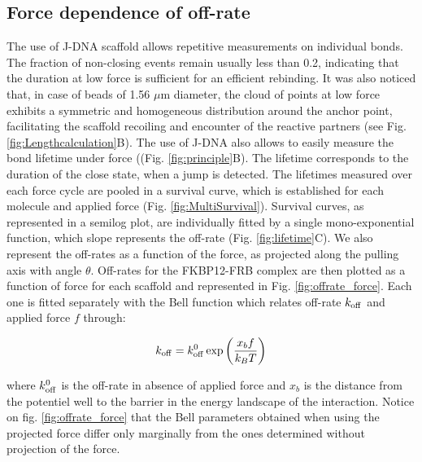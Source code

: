 \documentclass{biophys-new}
\begin{document}
\subsection*{Force dependence of off-rate}

The use of J-DNA scaffold allows repetitive measurements on individual bonds.
The fraction of non-closing events remain usually less than 0.2,  %
indicating that the duration at low force is sufficient for an efficient rebinding. It was also noticed that, in case of beads of 1.56 $\mu$m diameter, the cloud of points at low force exhibits a symmetric and homogeneous distribution around the anchor point, facilitating the scaffold recoiling and encounter of the reactive partners (see Fig. \ref{fig:Lengthcalculation}B). The use of J-DNA also allows to easily measure the bond lifetime under force ((Fig. \ref{fig:principle}B). The lifetime corresponds to the duration of the close state, when a jump is detected. %
The lifetimes measured over each force cycle are pooled in a survival curve, which is established for each molecule and applied force (Fig. \ref{fig:MultiSurvival}). Survival curves, as represented in a semilog plot, are individually fitted by a single mono-exponential function, which slope represents the off-rate (Fig. \ref{fig:lifetime}C). We also represent the off-rates as a function of the force, as projected along the pulling axis with angle $\theta$. Off-rates for the FKBP12-FRB complex are then plotted as a function of force for each scaffold and represented in Fig. \ref{fig:offrate_force}. Each one is fitted separately with the Bell function which relates off-rate $ k_{\rm off}$ and applied force $f$ through:

\begin{equation}
\label{eq:Bell}
k_{\rm off} = k^0_{\rm off} \exp \left(\frac{x_b f}{k_B T}\right)
\end{equation}

\noindent where $k^0_{\rm off}$ is the off-rate in absence of applied force and $x_b$ is the distance from the potentiel well to the barrier in the energy landscape of the interaction. Notice on fig. \ref{fig:offrate_force} that the Bell parameters obtained when using the projected force differ only marginally from the ones determined without projection of the force.
\end{document}
